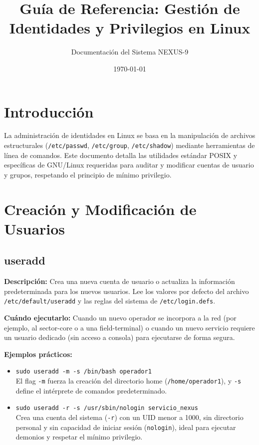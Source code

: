 \documentclass[11pt, a4paper]{article}
\title{\textbf{Guía de Referencia: Gestión de Identidades y Privilegios en Linux}}
\author{Documentación del Sistema NEXUS-9}
\date{\today}
\begin{document}
\maketitle

\section{Introducción}
La administración de identidades en Linux se basa en la manipulación de archivos estructurales (\texttt{/etc/passwd}, \texttt{/etc/group}, \texttt{/etc/shadow}) mediante herramientas de línea de comandos. Este documento detalla las utilidades estándar POSIX y específicas de GNU/Linux requeridas para auditar y modificar cuentas de usuario y grupos, respetando el principio de mínimo privilegio.

\section{Creación y Modificación de Usuarios}

\subsection{useradd}
\textbf{Descripción:} Crea una nueva cuenta de usuario o actualiza la información predeterminada para los nuevos usuarios. Lee los valores por defecto del archivo \texttt{/etc/default/useradd} y las reglas del sistema de \texttt{/etc/login.defs}.

\textbf{Cuándo ejecutarlo:} Cuando un nuevo operador se incorpora a la red (por ejemplo, al sector-core o a una field-terminal) o cuando un nuevo servicio requiere un usuario dedicado (sin acceso a consola) para ejecutarse de forma segura.

\textbf{Ejemplos prácticos:}
\begin{itemize}
    \item \texttt{sudo useradd -m -s /bin/bash operador1} \\
    El flag \texttt{-m} fuerza la creación del directorio home (\texttt{/home/operador1}), y \texttt{-s} define el intérprete de comandos predeterminado.
    \item \texttt{sudo useradd -r -s /usr/sbin/nologin servicio\_nexus} \\
    Crea una cuenta del sistema (\texttt{-r}) con un UID menor a 1000, sin directorio personal y sin capacidad de iniciar sesión (\texttt{nologin}), ideal para ejecutar demonios y respetar el mínimo privilegio.
\end{itemize}
\end{document}
